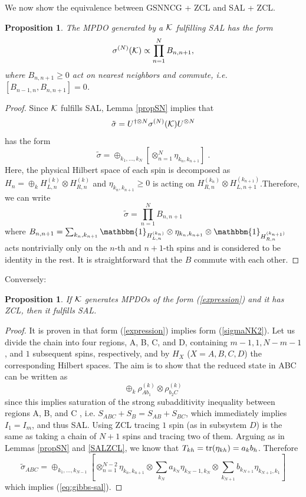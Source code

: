 \documentclass{elsarticle}
\newcommand{\Id}{\mathbbm{1}}
\newcommand{\be}{\begin{equation}}
\newcommand{\ee}{\end{equation}}
\newtheorem{prop}[thm]{Proposition}
\begin{document}
We now show the equivalence between GSNNCG + ZCL and SAL + ZCL.

\begin{prop}
    \label{3to4}
    The MPDO generated by a ${\cal K}$ fulfilling SAL has the form
    \be
        \label{expression}
        \sigma^{(N)}({\cal K})\propto \prod_{n=1}^N B_{n,n+1},
    \ee
    where $B_{n,n+1}\ge 0$ act on nearest neighbors and commute, i.e. $[B_{n-1,n},B_{n,n+1}]=0$.
\end{prop}

\begin{proof}
    Since ${\cal K}$ fulfills SAL, Lemma \ref{propSN} implies that
    \be
        \tilde \sigma = U^{\dagger\otimes  N} \sigma^{(N)}({\cal K})U^{\otimes  N}
    \ee
    has the form
    \be
        \label{sigmaNK2}
        \tilde \sigma= \oplus_{k_1,\ldots,k_N} \left[\otimes_{n=1}^N \eta_{k_n,k_{n+1}} \right]\;.
    \ee
    Here, the physical Hilbert space of each spin is decomposed as $H_n=\oplus_{k} H_{L,n}^{(k)}\otimes H_{R,n}^{(k)}$ and $\eta_{k_n,k_{n+1}}\ge 0$ is acting on $H_{R,n}^{(k_n)}\otimes H_{L,n+1}^{(k_{n+1})}$.Therefore, we can write
    \be
        \tilde\sigma= \prod_{n=1}^N B_{n,n+1}
    \ee
    where $B_{n,n+1}=\sum_{k_n, k_{n+1}} \Id_{H_{L,n}^{(k_n)}} \otimes \eta_{k_n,k_{n+1}}\otimes \Id_{H_{R,n}^{(k_{n+1})}}$ acts nontrivially only on the $n$-th and $n+1$-th spins and is considered to be identity in the rest. It is  straightforward that the $B$ commute with each other.
\end{proof}

Conversely:
\begin{prop}
    \label{4to2}
    If ${\cal K}$ generates MPDOs of the form (\ref{expression}) and it has ZCL,
    then it fulfills SAL.
\end{prop}

\begin{proof}
    It is proven in \cite{Beigi} that form (\ref{expression}) implies form
    (\ref{sigmaNK2}).
    Let us divide the chain into four regions, A, B, C, and D, containing $m-1,1,N-m-1$, and $1$ subsequent spins, respectively, and by $H_X$ ($X=A,B,C,D$) the corresponding Hilbert spaces. The aim is to show that the reduced state in ABC can be written as
    \be
        \label{eq:gibbs-sal}
        \oplus_k \rho_{A b_1}^{(k)} \otimes
        \rho_{b_2 C}^{(k)}
    \ee
    since this implies saturation of the strong subadditivity inequality between regions A, B, and C \cite{Hay03}, i.e. $S_{ABC}+S_B=S_{AB}+S_{BC}$, which immediately implies $I_1=I_m$, and thus SAL.
    Using ZCL tracing $1$ spin (as in subsystem $D$) is the same as taking a chain of $N+1$ spins and tracing two of them. Arguing as in Lemmas  \ref{propSN} and \ref{SALZCL}, we know that $T_{kh}={\rm tr} (\eta_{kh})=a_kb_h$.
    Therefore
    $$
        \tilde{\sigma}_{ABC}=\oplus_{k_1,\ldots,k_{N-1}} \left[\otimes_{n=1}^{N-2} \eta_{k_n,k_{n+1}}\otimes \sum_{k_N}a_{k_N} \eta_{k_N-1,k_{N}}\otimes \sum_{k_{N+1}}b_{k_{N+1}} \eta_{k_{N+1},k_{1}} \right]
    $$
    which implies (\ref{eq:gibbs-sal}).
\end{proof}
\end{document}
